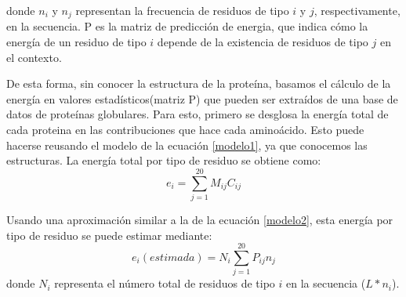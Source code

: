 \noindent donde $n_i$ y $n_j$ representan la frecuencia de residuos de tipo $i$ y $j$, respectivamente, en la secuencia.
P es la matriz de predicción de energia, que indica cómo la energía de un residuo de tipo $i$ depende de la existencia de residuos de tipo $j$ en el contexto.



De esta forma, sin conocer la estructura de la proteína, basamos el cálculo de la energía en valores estadísticos(matriz P) que pueden ser extraídos de una base de datos de proteínas globulares.
Para esto, primero se desglosa la energía total de cada proteina en las contribuciones que hace cada aminoácido.
Esto puede hacerse reusando el modelo de la ecuación \ref{modelo1}, ya que conocemos las estructuras. 
La energía total por tipo de residuo se obtiene como:
\begin{equation}\label{ek1}
  e_i = \sum_{j=1}^{20} M_{ij}C_{ij}
\end{equation}

Usando una aproximación similar a la de la ecuación \ref{modelo2}, esta energía por tipo de residuo se puede estimar mediante:
\begin{equation}\label{ek2}
e_i(estimada) = N_i\sum_{j=1}^{20} P_{ij}n_{j}
\end{equation}
\noindent donde $N_i$ representa el número total de residuos de tipo $i$ en la secuencia ($L*n_i$).

